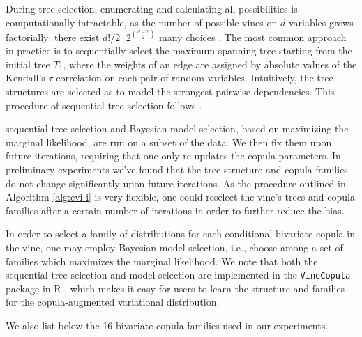 During tree selection, enumerating and calculating all possibilities is
computationally intractable, as the number of possible vines on $d$ variables
grows factorially: there exist $d!/2\cdot 2^{{d-2\choose 2}}$ many choices
\citep{morales2010about}.  The most common approach in practice is to
sequentially select the maximum spanning tree starting from the initial tree
$T_1$, where the weights of an edge are assigned by absolute values of the
Kendall's $\tau$ correlation on each pair of random variables. Intuitively, the
tree structures are selected as to model the strongest pairwise dependencies.
This procedure of sequential tree selection follows
\citet{dissmann2012selecting}.

sequential tree selection \citep{dissmann2012selecting} and Bayesian model
selection, based on maximizing the marginal likelihood, are run on a subset of
the data. We then fix them upon future iterations, requiring that one only
re-updates the copula parameters. In preliminary experiments we've found that
the tree structure and copula families do not change significantly upon future
iterations. As the procedure outlined in Algorithm \ref{alg:cvi-i} is very
flexible, one could reselect the vine's trees and copula families after a
certain number of iterations in order to further reduce the bias.
\fi

In order to select a family of distributions for each conditional bivariate
copula in the vine, one may employ Bayesian model selection, i.e., choose among
a set of families which maximizes the marginal likelihood. We note that both
the sequential tree selection and model selection are implemented in the
\texttt{VineCopula} package in R \citep{schepsmeier2015vine}, which makes it easy
for users to learn the structure and families for the copula-augmented
variational distribution.

We also list below the 16 bivariate copula families used in our experiments.

